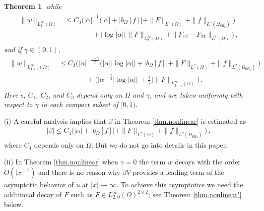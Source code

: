 \documentclass[11pt,a4paper]{article}
\newtheorem{theorem}{Theorem }[section]
\begin{document}
\begin{theorem}
%
while
%
\begin{align}
\begin{split}
\| w \|_{L^\infty_1 (\Omega)} 
& \leq C_3 
\bigg ( |\alpha|^{-\frac{1}{2}} 
\big ( |\alpha | + |b_\Omega[f]| +  \| F\|_{L^2 (\Omega)} + \| f \|_{L^2 (\Omega_{6 R_0})}  \big )  \\
& \qquad\qquad 
+ \big | \log |\alpha|\big |\,    \| F \|_{L^\infty_{2} (\Omega)}  + \| F_{12} - F_{21} \|_{L^1 (\Omega)} \bigg ) \,,\label{est.thm.nonlinear.3}
\end{split}
\end{align}
%
and if $\gamma \in (0,1)$,
%
\begin{align}
\begin{split}
\| w \|_{L^\infty_{1+\gamma} (\Omega)} 
& \leq C_3 \bigg ( |\alpha|^{-\frac{1+\gamma}{2}} \big ( |\alpha | |\log |\alpha|  \big | 
+ |b_\Omega[f]| +  \| F\|_{L^2 (\Omega)} + \| f \|_{L^2 (\Omega_{6 R_0})}  \big )  \\
& \quad  \quad\quad\quad  + \big (  |\alpha|^{-\frac{\gamma}{2}} \big | \log |\alpha|\big |\,   + \frac{1}{\gamma} \big ) \| F \|_{L^\infty_{2+\gamma} (\Omega)}  \bigg )\,.\label{est.thm.nonlinear.4}
\end{split}
\end{align}
%
Here $\epsilon$, $C_1$, $C_2$, and $C_3$ depend only on $\Omega$ and $\gamma$, and are taken uniformly with respect to $\gamma$ in each compact subset of $[0,1)$. 
\end{theorem}

\begin{remark} (i) A careful analysis implies that  $\beta$ in Theorem \ref{thm.nonlinear} is estimated as 
%
\begin{align}
|\beta| \leq C_4 \big ( |\alpha| + |b_\Omega[f]| + \| F \|_{L^2 (\Omega)} + \| f\|_{L^2 (\Omega_{6 R_0})} \big )\,,
\end{align}
%
where $C_4$ depends only on $\Omega$. But we do not go into details in this paper.

\noindent (ii) In Theorem \ref{thm.nonlinear} when $\gamma=0$ the term $w$ decays with the order $O(|x|^{-1})$ and there is no reason why $\beta V$ provides a leading term of the asymptotic behavior of $u$ at $|x|\rightarrow \infty$. 
To achieve this asymptotics  we need the additional decay of $F$ such as $F\in L^\infty_{2,0} (\Omega)^{2\times 2}$; see Theorem \ref{thm.nonlinear'} below.

\end{remark}
\end{document}
